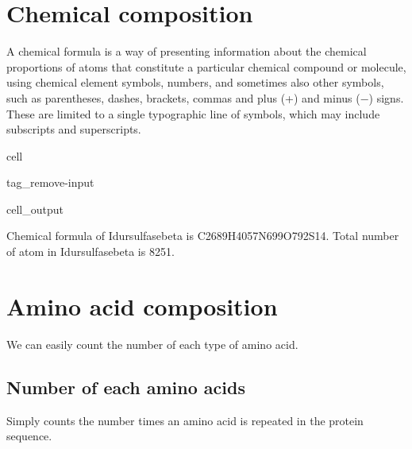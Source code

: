 \documentclass[letterpaper,10pt,english]{jupyterBook}
\begin{document}
\section{Chemical composition}
\label{\detokenize{ipynb/chapter1:chemical-composition}}
\sphinxAtStartPar
A chemical formula is a way of presenting information about the chemical proportions of atoms that constitute a particular chemical compound or molecule, using chemical element symbols, numbers, and sometimes also other symbols, such as parentheses, dashes, brackets, commas and plus (+) and minus (−) signs. These are limited to a single typographic line of symbols, which may include subscripts and superscripts.

\begin{sphinxuseclass}{cell}
\begin{sphinxuseclass}{tag_remove-input}\begin{sphinxVerbatimOutput}

\begin{sphinxuseclass}{cell_output}
\begin{sphinxVerbatim}[commandchars=\\\{\}]
Chemical formula of Idursulfasebeta is C2689H4057N699O792S14.
Total number of atom in Idursulfasebeta is 8251.
\end{sphinxVerbatim}

\end{sphinxuseclass}\end{sphinxVerbatimOutput}

\end{sphinxuseclass}
\end{sphinxuseclass}

\section{Amino acid composition}
\label{\detokenize{ipynb/chapter1:amino-acid-composition}}
\sphinxAtStartPar
We can easily count the number of each type of amino acid.


\subsection{Number of each amino acids}
\label{\detokenize{ipynb/chapter1:number-of-each-amino-acids}}
\sphinxAtStartPar
Simply counts the number times an amino acid is repeated in the protein sequence.
\end{document}
